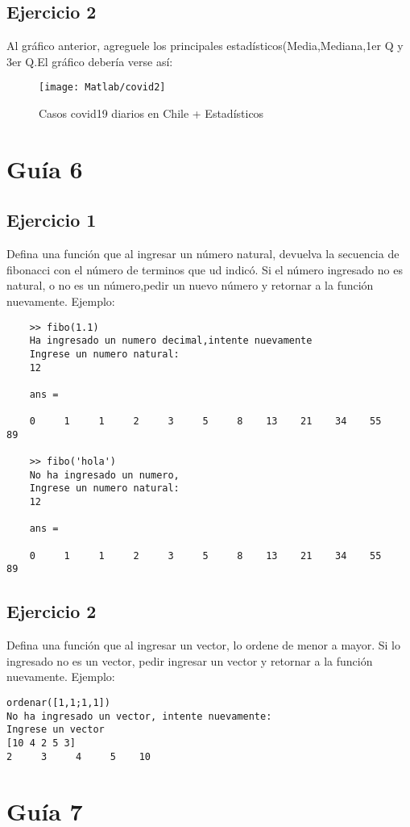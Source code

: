 \subsection{Ejercicio 2}
Al gráfico anterior, agreguele los principales estadísticos(Media,Mediana,1er Q y 3er Q.El gráfico debería verse así:\
\begin{figure}[h]
	\centering
	\texttt{[image: Matlab/covid2]}
	\caption{Casos covid19 diarios en Chile + Estadísticos}
	\label{fig:covid2}
\end{figure}
\newpage
\section{Guía 6}
\subsection{Ejercicio 1}
Defina una función que al ingresar un número natural, devuelva la secuencia de fibonacci con el número de terminos que ud indicó. Si el número ingresado no es natural, o no es un número,pedir un nuevo número y retornar a la función nuevamente. Ejemplo:
\begin{lstlisting}
	>> fibo(1.1)
	Ha ingresado un numero decimal,intente nuevamente
	Ingrese un numero natural: 
	12
	
	ans =
	
	0     1     1     2     3     5     8    13    21    34    55    89
	
	>> fibo('hola')
	No ha ingresado un numero,
	Ingrese un numero natural: 
	12
	
	ans =
	
	0     1     1     2     3     5     8    13    21    34    55    89
\end{lstlisting}
\subsection{Ejercicio 2}
Defina una función que al ingresar un vector, lo ordene de menor a mayor. Si lo ingresado no es un vector, pedir ingresar un vector y retornar a la función nuevamente. Ejemplo:
\begin{lstlisting}
ordenar([1,1;1,1])
No ha ingresado un vector, intente nuevamente: 
Ingrese un vector 
[10 4 2 5 3]
2     3     4     5    10
\end{lstlisting}\newpage
\section{Guía 7}
